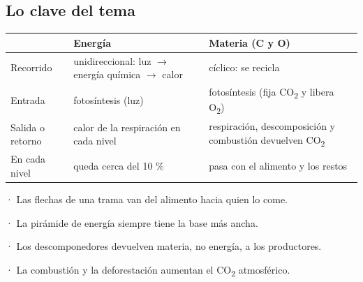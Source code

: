 \subsection{Lo clave del tema}
\begin{center}\small
\begin{tabularx}{\linewidth}{@{}>{\raggedright\arraybackslash\hsize=0.50\hsize}X>{\raggedright\arraybackslash\hsize=1.25\hsize}X>{\raggedright\arraybackslash\hsize=1.25\hsize}X@{}}
\toprule
 & \textbf{Energía} & \textbf{Materia (C y O)} \\
\midrule
Recorrido & unidireccional: luz \ensuremath{\rightarrow} energía química \ensuremath{\rightarrow} calor & cíclico: se recicla \\
Entrada & fotosíntesis (luz) & fotosíntesis (fija CO\textsubscript{2} y libera O\textsubscript{2}) \\
Salida o retorno & calor de la respiración en cada nivel & respiración, descomposición y combustión devuelven CO\textsubscript{2} \\
En cada nivel & queda cerca del 10 \% & pasa con el alimento y los restos \\
\bottomrule
\end{tabularx}
\end{center}
 
\begin{clave}[{Recuerda}] · Las flechas de una trama van del alimento hacia quien lo come.\par · La pirámide de energía siempre tiene la base más ancha.\par · Los descomponedores devuelven materia, no energía, a los productores.\par · La combustión y la deforestación aumentan el CO\textsubscript{2} atmosférico.\end{clave}
 
